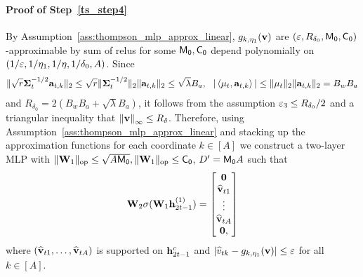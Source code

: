 \paragraph{Proof of Step~\ref{ts_step4}}
By Assumption~\ref{ass:thompson_mlp_approx_linear},  $g_{k,{\eta_1}}({\mathbf{v}})$ are $(\varepsilon,R_{\delta_0}, {\mathsf{M_0}},{{\mathsf{C_0}}})$-approximable by sum of relus for some $ {\mathsf{M_0}},{{\mathsf{C_0}}}$ depend polynomially on $(1/\varepsilon,1/{\eta_1},1/{\eta},1/\delta_0,A)$. Since
\begin{align*}
\|\sqrt{{r}}{{\mathbf\Sigma}}_t^{-1/2}{\mathbf a}_{t,k}\|_2\leq \sqrt{{r}}\|{{\mathbf\Sigma}}_t^{-1/2}\|_2\|{\mathbf a}_{t,k}\|_2\leq\sqrt{\lambda}B_a,~~|\left\langle{{\mathbf\mu}}_t,{\mathbf a}_{t,k}\right\rangle|\leq \|{{\mathbf\mu}}_t\|_2\|{\mathbf a}_{t,k}\|_2=B_wB_a
\end{align*}
and $R_{\delta_0}=2(B_wB_a+\sqrt{\lambda}B_a)$, it follows from 
the assumption  $\varepsilon_3\leq R_{\delta_0}/2$ and  a triangular inequality that $\left\|{{\mathbf v}}\right\|_\infty\leq R_\delta$. Therefore, using Assumption~\ref{ass:thompson_mlp_approx_linear} and stacking up the approximation functions for each coordinate $k\in[A]$ we construct a two-layer MLP with $\|{{\mathbf W}_1}\|_{\mathrm{op}}\leq \sqrt{A{\mathsf{M_0}}},\|{{\mathbf W}_1}\|_{\mathrm{op}}\leq {{\mathsf{C_0}}}$, $D'= {\mathsf{M_0}} A$ such that 
\begin{align*}{\mathbf W}_2\sigma({\mathbf W}_1{\mathbf h}^{(1)}_{2t-1})=\begin{bmatrix}
    {\mathbf 0}\\\widehat {{\mathbf v}}_{t1}\\\vdots\\\widehat{{\mathbf v}}_{tA}\\{\mathbf 0},
\end{bmatrix}
\end{align*}
where $(\widehat {{\mathbf v}}_{t1},\ldots,\widehat{{\mathbf v}}_{tA})$ is supported on ${\mathbf h}^c_{2t-1}$ and $|\widehat v_{tk}-g_{k,{\eta_1}}({\mathbf{v}})|\leq \varepsilon$ for all $k\in[A]$. 

















